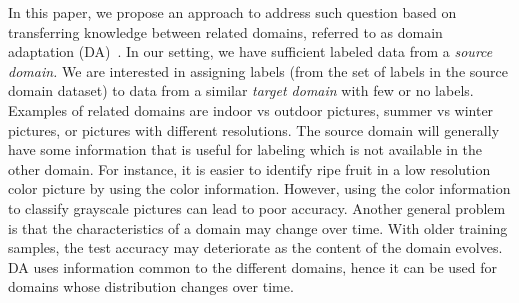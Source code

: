 \documentclass{article}
\newcommand{\elisa}[1]{\textbf{\color{red}Elisa: #1}}
\begin{document}


In this paper, we propose an approach to address such question based on transferring knowledge between related domains, referred to as domain adaptation (DA)~\cite{zhang2022transfer,zhang2021survey}. 
In our setting, we have sufficient labeled data from a \textit{source domain.} We are interested in assigning labels (from the set of labels in the source domain dataset) to data from a similar \textit{target domain} with few or no labels. %
Examples of related domains are indoor vs outdoor pictures, summer vs winter pictures, or pictures with different resolutions. %
The source domain will generally have some information that is useful for labeling which is not available in the other domain. For instance, it is easier to identify ripe fruit in a low resolution color picture by using the color information. However, using the color information to classify grayscale pictures can lead to poor accuracy. %
Another general problem is that the characteristics of a domain may change over time. With older training samples, the test accuracy may deteriorate as the content of the domain evolves. DA uses information common to the different domains, hence it can be used for domains whose distribution changes over time.%
\end{document}
